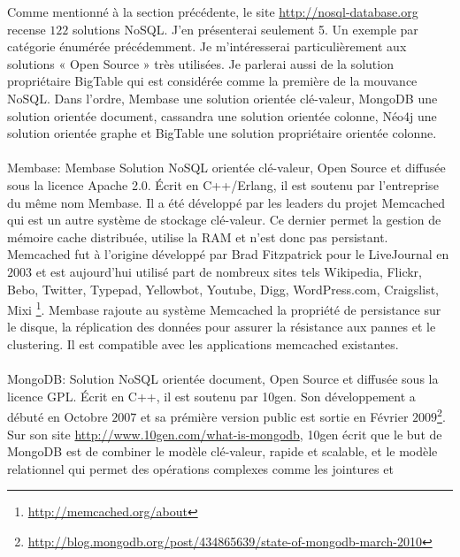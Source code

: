 Comme mentionné à la section précédente, le
site \url{http://nosql-database.org} recense $122$
solutions \textsf{NoSQL}.  J'en présenterai seulement 5. Un exemple
par catégorie énumérée précédemment. Je m'intéresserai
particulièrement aux solutions « \textsf{Open Source} » très
utilisées. Je parlerai aussi de la solution propriétaire \textsf{BigTable}
qui est considérée comme la première de la
mouvance \textsf{NoSQL}. Dans l'ordre, \textsf{Membase} une solution
orientée \textsf{clé-valeur}, \textsf{MongoDB} une solution
orientée \textsf{document}, \textsf{cassandra} une solution
orientée \textsf{colonne}, \textsf{Néo4j} une solution
orientée \textsf{graphe} et \textsf{BigTable} une solution
propriétaire orientée \textsf{colonne}.
\\
\\
\textsf{Membase}: \textsf{Membase} Solution \textsf{NoSQL} orientée \textsf{clé-valeur}, Open Source et diffusée sous la licence Apache 2.0. Écrit en \textsf{C++/Erlang}, il est soutenu par l'entreprise du même nom \textsf{Membase}\cite{RickCattell}. Il a été développé par les leaders du projet \textsf{Memcached} qui est un
autre système de stockage \textsf{clé-valeur}. Ce dernier permet la
gestion de mémoire cache distribuée, utilise la \textsf{RAM} et n'est
donc pas persistant. \textsf{Memcached} fut à l'origine développé
par \textsf{Brad Fitzpatrick} pour le \textsf{LiveJournal} en $2003$
et est aujourd'hui utilisé part de nombreux sites
tels \textsf{Wikipedia, Flickr, Bebo, Twitter, Typepad, Yellowbot,
Youtube, Digg, WordPress.com, Craigslist,
Mixi} \footnote{\url{http://memcached.org/about}}. \textsf{Membase}
rajoute au système \textsf{Memcached} la propriété de persistance sur
le disque, la réplication des données pour assurer la résistance aux
pannes et le clustering. Il est compatible avec les applications
memcached existantes.
\\
\\ 
{\sf MongoDB}:  Solution \textsf{NoSQL} orientée \textsf{document},
Open Source et diffusée sous la licence \textsf{GPL}. Écrit
en \textsf{C++}, il est soutenu
par \textsf{10gen}\cite{RickCattell}. Son développement a débuté en Octobre $2007$ et sa prémière version public est sortie en Février $2009$\footnote{\url{http://blog.mongodb.org/post/434865639/state-of-mongodb-march-2010}}. Sur son
site \url{http://www.10gen.com/what-is-mongodb}, \textsf{10gen} écrit
que le but de \textsf{MongoDB} est de combiner le
modèle \textsf{clé-valeur}, rapide et scalable, et le modèle
relationnel qui permet des opérations complexes comme les jointures et
